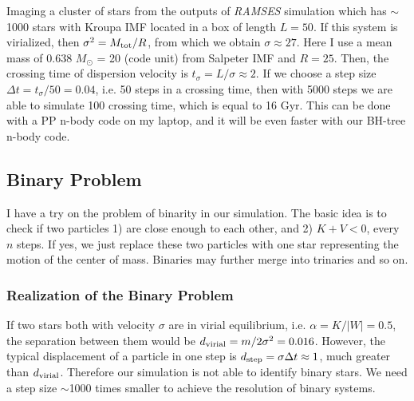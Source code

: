 Imaging a cluster of stars from the outputs of \textit{RAMSES} simulation which has $ \sim 
$ 1000 stars with Kroupa IMF located in a box of length $ L = 50 $. If this system is 
virialized, then $ \sigma^2 = M_{\rm tot} / R $, from which we obtain $ \sigma \approx 
27 $. Here I use a mean mass of 0.638 $ M_\odot $ = 20 (code unit) from Salpeter IMF and 
$ R = 25 $.
Then, the crossing time of dispersion velocity is $ t_{\sigma} = L / \sigma \approx 2 $.
If we choose a step size $ \Delta t  = t_\sigma / 50 = 0.04 $, i.e. 50 steps in a crossing time, 
then with 5000 steps we are able to simulate 100 crossing time, which is equal to 16 Gyr. 
This can be done with a PP n-body code on my laptop, and it will be even faster with our 
BH-tree n-body code.

\subsection*{Binary Problem}
I have a try on the problem of binarity in our simulation.
The basic idea is to check if two particles 1) are close enough to each other, and 2) $ K + V 
< 0 $, every $ n $ steps. If yes, we just replace these two particles with one star 
representing the motion of the center of mass. Binaries may further merge into trinaries 
and so on.


\subsubsection*{Realization of the Binary Problem}
If two stars both with velocity $ \sigma $ are in virial equilibrium, i.e. $ \alpha = K/|W| = 0.5 
$, the separation between them would be $ d_{\rm virial} = m /2 \sigma^2 = 0.016 $. 
However, the typical displacement of a particle in one step is $ d_{\rm step} = \sigma \Delta 
t \approx 1 $, much greater than $ d_{\rm virial} $. Therefore our simulation is not able to 
identify binary stars. We need a step size $ \sim $1000 times smaller to achieve the 
resolution of binary systems.

